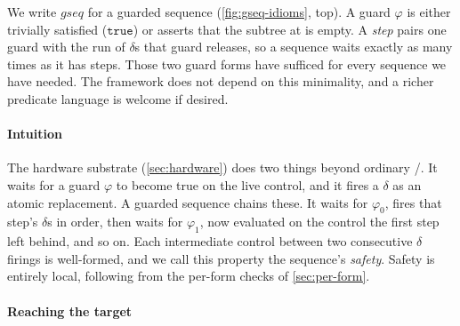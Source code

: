We write \(\mathit{gseq}\) for a guarded sequence (\cref{fig:gseq-idioms}, top).
A guard \(\varphi\) is either trivially satisfied (\(\mathtt{true}\)) or asserts that the subtree at \pth is empty.
A \emph{step} pairs one guard with the run of \(\delta\)s that guard releases, so a sequence waits exactly as many times as it has steps.
Those two guard forms have sufficed for every sequence we have needed.
The framework does not depend on this minimality, and a richer predicate language is welcome if desired.

\paragraph{Intuition}

The hardware substrate (\cref{sec:hardware}) does two things beyond ordinary \push{}/\pop{}.
It waits for a guard \(\varphi\) to become true on the live control, and it fires a \(\delta\) as an atomic replacement.
A guarded sequence chains these.
It waits for \(\varphi_0\), fires that step's \(\delta\)s in order, then waits for \(\varphi_1\), now evaluated on the control the first step left behind, and so on.
Each intermediate control between two consecutive \(\delta\) firings is well-formed, and we call this property the sequence's \emph{safety}.
Safety is entirely local, following from the per-form checks of \cref{sec:per-form}.


\paragraph{Reaching the target}

